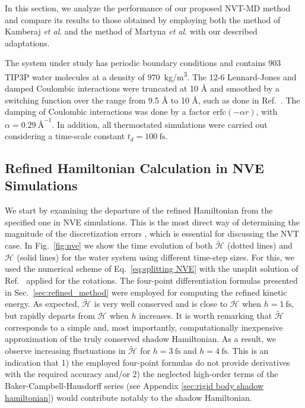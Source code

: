\documentclass[
	aip,
	jcp,
	reprint,
]{revtex4-1}
\newcommand{\Ham}[1]{{\mathcal H}_\text{#1}}           %
\newcommand{\timestep}{h}
\newcommand{\refined}[1]{\widetilde{#1}}
\begin{document}
In this section, we analyze the performance of our proposed NVT-MD method and compare its results to those obtained by employing both the method of Kamberaj \textit{et al}. \cite{Kamberaj_2005} and the method of Martyna \textit{et al}. \cite{Martyna_1996} with our described adaptations.

The system under study has periodic boundary conditions and contains 903 TIP3P \cite{Jorgensen_1983} water molecules at a density of 970~kg/m\textsuperscript{3}.
The 12-6 Lennard-Jones and damped Coulombic interactions were truncated at 10 {\AA} and smoothed by a switching function over the range from 9.5 {\AA} to 10 {\AA}, such as done in Ref.~. 
The damping of Coulombic interactions was done by a factor $\text{erfc}(-\alpha r)$, with $\alpha = 0.29~\text{\AA}^{-1}$.
In addition, all thermostated simulations were carried out considering a time-scale constant $t_d = 100~\text{fs}$.

\subsection{Refined Hamiltonian Calculation in NVE Simulations}

We start by examining the departure of the refined Hamiltonian from the specified one in NVE simulations.
This is the most direct way of determining the magnitude of the discretization errors \cite{Engle_2005}, which is essential for discussing the NVT case.
In Fig.~\ref{fig:nve} we show the time evolution of both $\refined{\Ham{}}$ (dotted lines) and $\Ham{}$ (solid lines) for the water system using different time-step sizes.
For this, we used the numerical scheme of Eq.~\eqref{eq:splitting NVE} with the unsplit solution of Ref.~ applied for the rotations.
The four-point differentiation formulas presented in Sec.~\ref{sec:refined_method} were employed for computing the refined kinetic energy.
As expected, $\refined{\Ham{}}$ is very well conserved and is close to $\Ham{}$ when $\timestep = 1~\text{fs}$, but rapidly departs from $\Ham{}$ when $\timestep$ increases.
It is worth remarking that $\refined{\Ham{}}$ corresponds to a simple and, most importantly, computationally inexpensive approximation of the truly conserved shadow Hamiltonian.
As a result, we observe increasing fluctuations in $\refined{\Ham{}}$ for $\timestep = 3~\text{fs}$ and $\timestep = 4~\text{fs}$.
This is an indication that
1) the employed four-point formulas do not provide derivatives with the required accuracy and/or
2) the neglected high-order terms of the Baker-Campbell-Hausdorff series (see Appendix \ref{sec:rigid body shadow hamiltonian}) would contribute notably to the shadow Hamiltonian.
\end{document}

